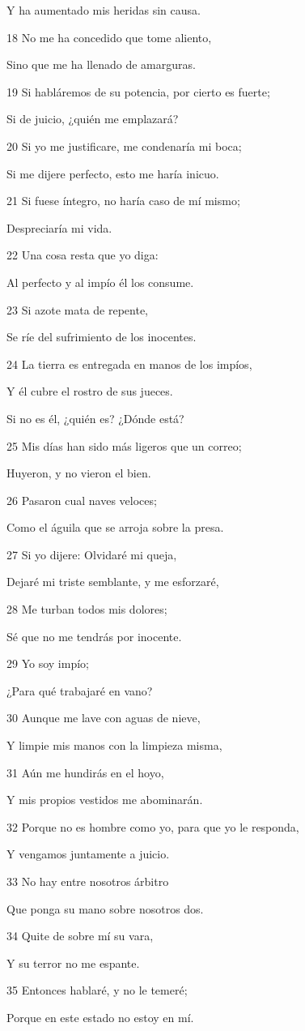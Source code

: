 \par Y ha aumentado mis heridas sin causa. 
\par 18 No me ha concedido que tome aliento,
\par Sino que me ha llenado de amarguras.
\par 19 Si habláremos de su potencia, por cierto es fuerte;
\par Si de juicio, ¿quién me emplazará?
\par 20 Si yo me justificare, me condenaría mi boca;
\par Si me dijere perfecto, esto me haría inicuo.
\par 21 Si fuese íntegro, no haría caso de mí mismo;
\par Despreciaría mi vida.
\par 22 Una cosa resta que yo diga: 
\par Al perfecto y al impío él los consume.
\par 23 Si azote mata de repente,
\par Se ríe del sufrimiento de los inocentes.
\par 24 La tierra es entregada en manos de los impíos,
\par Y él cubre el rostro de sus jueces.
\par Si no es él, ¿quién es? ¿Dónde está?
\par 25 Mis días han sido más ligeros que un correo;
\par Huyeron, y no vieron el bien.
\par 26 Pasaron cual naves veloces;
\par Como el águila que se arroja sobre la presa.
\par 27 Si yo dijere: Olvidaré mi queja,
\par Dejaré mi triste semblante, y me esforzaré, 
\par 28 Me turban todos mis dolores;
\par Sé que no me tendrás por inocente.
\par 29 Yo soy impío;
\par ¿Para qué trabajaré en vano?
\par 30 Aunque me lave con aguas de nieve,
\par Y limpie mis manos con la limpieza misma,
\par 31 Aún me hundirás en el hoyo,
\par Y mis propios vestidos me abominarán.
\par 32 Porque no es hombre como yo, para que yo le responda,
\par Y vengamos juntamente a juicio.
\par 33 No hay entre nosotros árbitro
\par Que ponga su mano sobre nosotros dos. 
\par 34 Quite de sobre mí su vara,
\par Y su terror no me espante.
\par 35 Entonces hablaré, y no le temeré;
\par Porque en este estado no estoy en mí.

